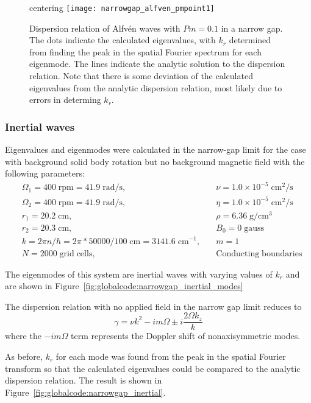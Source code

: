 \documentclass[letterpaper]{article}
\begin{document}
\begin{figure}
centering
\texttt{[image: narrowgap\_alfven\_pmpoint1]}
\caption[Dispersion relation of Alfv\'en waves with $Pm=0.1$ in a
  narrow gap]{Dispersion relation of Alfv\'en waves with $Pm=0.1$ in a
  narrow gap. The dots indicate the calculated eigenvalues, with $k_r$
  determined from finding the peak in the spatial Fourier spectrum for
  each eigenmode. The lines indicate the analytic solution to the
  dispersion relation. Note that there is some deviation of the
  calculated eigenvalues from the analytic dispersion relation, most
  likely due to errors in determing $k_r$.}
\label{fig:globalcode:narrowgap_alfven_pmpoint1}
\end{figure}


\subsubsection{Inertial waves}

Eigenvalues and eigenmodes were calculated in the narrow-gap limit for
the case with background solid body rotation but no background
magnetic field with the following parameters:
\begin{align*}
&\Omega_1 = 400\;\mathrm{rpm} = 41.9\;\mathrm{rad/s},\quad
    &\nu = 1.0\times10^{-5}\;\mathrm{cm^2/s}
\\
&\Omega_2 = 400\;\mathrm{rpm} = 41.9\;\mathrm{rad/s},\quad
    &\eta = 1.0\times10^{-5}\;\mathrm{cm^2/s}
\\
&r_1 = 20.2\;\mathrm{cm},\quad &\rho = 6.36\;\mathrm{g/cm^3}
\\
&r_2 = 20.3\;\mathrm{cm},\quad &B_0 = 0\; \mathrm{gauss}
\\
&k = 2\pi n/h = 2\pi*50000/100\;\mathrm{cm} = 3141.6\;\mathrm{cm^{-1}},\quad
    &m=1
\\
&N = 2000\;\mathrm{grid\;cells},\quad &\mathrm{Conducting\;boundaries}
\end{align*}

The eigenmodes of this system are inertial waves with varying values
of $k_r$ and are shown in
Figure~\ref{fig:globalcode:narrowgap_inertial_modes}

The dispersion relation with no applied field in the narrow gap limit
reduces to
\begin{equation}
\gamma = \nu k^2 - im\Omega \pm i \frac{2 \Omega k_z}{k}
\end{equation}
where the $-im\Omega$ term represents the Doppler shift of
nonaxisymmetric modes.

As before, $k_r$ for each mode was found from the peak in the spatial
Fourier transform so that the calculated eigenvalues could be compared
to the analytic dispersion relation. The result is shown in
Figure~\ref{fig:globalcode:narrowgap_inertial}.
\end{document}
